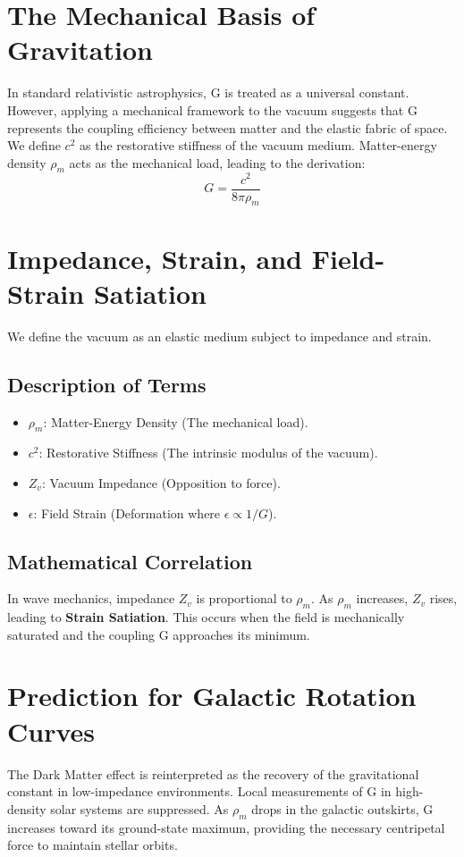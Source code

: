\documentclass[12pt,a4paper]{article}
\begin{document}
\section{The Mechanical Basis of Gravitation}
In standard relativistic astrophysics, G is treated as a universal constant. However, applying a mechanical framework to the vacuum suggests that G represents the coupling efficiency between matter and the elastic fabric of space. We define $c^2$ as the restorative stiffness of the vacuum medium. Matter-energy density $\rho_m$ acts as the mechanical load, leading to the derivation:
\begin{equation}
G = \frac{c^2}{8\pi\rho_m}
\end{equation}

\section{Impedance, Strain, and Field-Strain Satiation}
We define the vacuum as an elastic medium subject to impedance and strain. 

\subsection{Description of Terms}
\begin{itemize}
    \item $\rho_m$: Matter-Energy Density (The mechanical load).
    \item $c^2$: Restorative Stiffness (The intrinsic modulus of the vacuum).
    \item $Z_v$: Vacuum Impedance (Opposition to force).
    \item $\epsilon$: Field Strain (Deformation where $\epsilon \propto 1/G$).
\end{itemize}

\subsection{Mathematical Correlation}
In wave mechanics, impedance $Z_v$ is proportional to $\rho_m$. As $\rho_m$ increases, $Z_v$ rises, leading to \textbf{Strain Satiation}. This occurs when the field is mechanically saturated and the coupling G approaches its minimum. 

\section{Prediction for Galactic Rotation Curves}
The Dark Matter effect is reinterpreted as the recovery of the gravitational constant in low-impedance environments. Local measurements of G in high-density solar systems are suppressed. As $\rho_m$ drops in the galactic outskirts, G increases toward its ground-state maximum, providing the necessary centripetal force to maintain stellar orbits.
\end{document}
